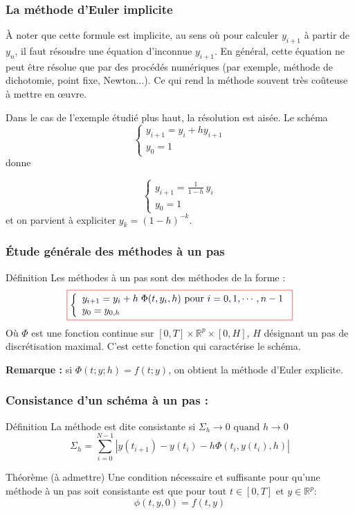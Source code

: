 \documentclass{beamer}
\newcommand{\myredbox}[1]{\fcolorbox{red}{white}{$\displaystyle#1$}}
\begin{document}
\begin{frame}
\frametitle{La méthode d'Euler implicite}  
À noter que cette formule est implicite, au sens où pour calculer $y_{i+1}$ à partir de $y_n$, il faut résoudre une équation d'inconnue $y_{i+1}$. En général, cette équation ne peut être résolue que par des procédés numériques (par exemple, méthode de dichotomie, point fixe, Newton...). Ce qui rend la méthode souvent très coûteuse à mettre en œuvre.

Dans le cas de l'exemple étudié plus haut, la résolution est aisée. Le schéma
\[\left\{\begin{array}{l}
y_{i+1}=y_i+h y_{i+1}\\
y_0=1
\end{array}\right.
\] donne 

\[\left\{\begin{array}{l}
y_{i+1}=\frac 1{1-h}\, y_i\\
y_0=1
\end{array}\right.
\]  et on parvient à expliciter $y_k = (1 - h)^{-k}$.
 \end{frame}  


   \begin{frame}
\frametitle{Étude générale des méthodes à un pas}
\begin{block}{Définition}
Les méthodes à un pas sont des méthodes de la forme :
\[\myredbox{\left\{\begin{array}{l}
y_{i+1} =y_{i}+ h \;\Phi(t, y_i,h) \mbox{ pour }i=0,1,\cdots,n-1\\
y_0 = y_{0,h}
\end{array}\right.}
\]
Où $\Phi$ est une fonction continue sur $[0,T]\times \mathbb{R}^p\times [0,H]$, $H$ désignant un pas de discrétisation maximal. C'est cette fonction qui caractérise le schéma.  
\end{block}

{\bf Remarque :} si $\Phi(t;y;h)=f(t; y)$, on obtient la méthode d'Euler explicite.

 \end{frame}   

 \begin{frame}
\frametitle{Consistance d'un schéma à un pas :}
\begin{block}{Définition}
La méthode est dite consistante si $\Sigma_h\longrightarrow  0\mbox{ quand }h\longrightarrow 0$
\[\Sigma_h=\sum_{i=0}^{N-1}\left|y(t_{i+1})-y(t_i)-h \Phi(t_i,y(t_i),h)\right|\]
\end{block}

\begin{block}{Théorème (à admettre)}
Une condition nécessaire et suffisante pour qu'une méthode à un pas soit consistante est que pour tout $t\in[0,T]$ et $y\in\mathbb{R}^p$:
\[\phi(t,y,0)=f(t,y)\]
\end{block}

 \end{frame}
\end{document}

